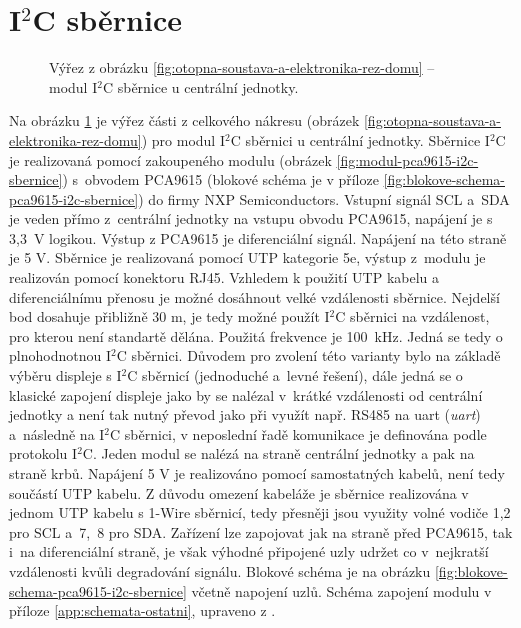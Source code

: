 \section{I$^2$C sběrnice}
\label{sec:i2c-sbernice}

\begin{figure}[H]
   \centering
    \def\svgwidth{0.3\columnwidth}
   
    \caption[Výřez pro modul I$^2$C sběrnice u centrální jednotky.]{Výřez z obrázku \ref{fig:otopna-soustava-a-elektronika-rez-domu} – modul I$^2$C sběrnice u centrální jednotky.}
    \label{fig:vyrez-i2c-sbernice}
\end{figure}

Na obrázku \ref{fig:vyrez-i2c-sbernice} je výřez části z celkového nákresu (obrázek \ref{fig:otopna-soustava-a-elektronika-rez-domu}) pro modul I$^2$C sběrnici u centrální jednotky. Sběrnice I$^2$C je realizovaná pomocí zakoupeného modulu (obrázek \ref{fig:modul-pca9615-i2c-sbernice}) s~obvodem PCA9615 \cite{vyrobce-pca9615} (blokové schéma je v příloze \ref{fig:blokove-schema-pca9615-i2c-sbernice}) do firmy  NXP Semiconductors. Vstupní signál SCL a~SDA je veden přímo z~centrální jednotky na vstupu obvodu PCA9615, napájení je s 3,3~V logikou. Výstup z PCA9615 je diferenciální signál. Napájení na této straně je 5 V. Sběrnice je realizovaná pomocí UTP kategorie 5e, výstup z~modulu je realizován pomocí konektoru RJ45. Vzhledem k použití UTP kabelu a diferenciálnímu přenosu je možné dosáhnout velké vzdálenosti sběrnice. Nejdelší bod dosahuje přibližně 30 m, je tedy možné použít I$^2$C sběrnici na vzdálenost, pro kterou není standartě dělána. Použitá frekvence je 100~kHz. Jedná se tedy o plnohodnotnou I$^2$C sběrnici. Důvodem pro zvolení této varianty bylo na základě výběru displeje s I$^2$C sběrnicí (jednoduché a~levné řešení), dále jedná se o klasické zapojení displeje jako by se nalézal v~krátké vzdálenosti od centrální jednotky a není tak nutný převod jako při využít např. RS485 na \acrshort{uart} (\textit{\acrlong{uart}}) a~následně na I$^2$C sběrnici, v neposlední řadě komunikace je definována podle protokolu I$^2$C.  Jeden modul se nalézá na straně centrální jednotky a pak na straně krbů. Napájení 5 V je realizováno pomocí samostatných kabelů, není tedy součástí UTP kabelu. Z důvodu omezení kabeláže je sběrnice realizována v jednom UTP kabelu s 1-Wire sběrnicí, tedy přesněji jsou využity volné vodiče 1,2 pro SCL a~7,~8 pro SDA. Zařízení lze zapojovat jak na straně před PCA9615, tak i~na diferenciální straně, je však výhodné připojené uzly udržet co v~nejkratší vzdálenosti kvůli degradování signálu. Blokové schéma je na obrázku \ref{fig:blokove-schema-pca9615-i2c-sbernice} včetně napojení uzlů. Schéma zapojení modulu v příloze \ref{app:schemata-ostatni}, upraveno z \cite{pca9615-schema-zapojeni}.


